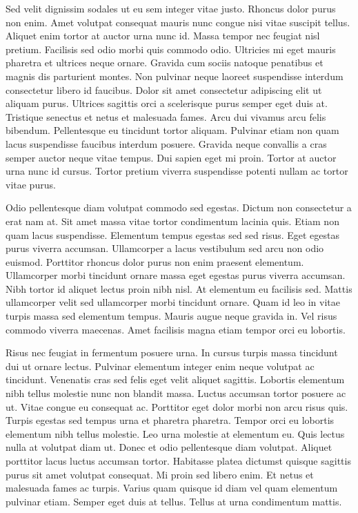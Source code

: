 \documentclass[11pt,a4paper]{article}
\begin{document}
Sed velit dignissim sodales ut eu sem integer vitae justo. Rhoncus dolor purus non enim. Amet volutpat consequat mauris nunc congue nisi vitae suscipit tellus. Aliquet enim tortor at auctor urna nunc id. Massa tempor nec feugiat nisl pretium. Facilisis sed odio morbi quis commodo odio. Ultricies mi eget mauris pharetra et ultrices neque ornare. Gravida cum sociis natoque penatibus et magnis dis parturient montes. Non pulvinar neque laoreet suspendisse interdum consectetur libero id faucibus. Dolor sit amet consectetur adipiscing elit ut aliquam purus. Ultrices sagittis orci a scelerisque purus semper eget duis at. Tristique senectus et netus et malesuada fames. Arcu dui vivamus arcu felis bibendum. Pellentesque eu tincidunt tortor aliquam. Pulvinar etiam non quam lacus suspendisse faucibus interdum posuere. Gravida neque convallis a cras semper auctor neque vitae tempus. Dui sapien eget mi proin. Tortor at auctor urna nunc id cursus. Tortor pretium viverra suspendisse potenti nullam ac tortor vitae purus.

Odio pellentesque diam volutpat commodo sed egestas. Dictum non consectetur a erat nam at. Sit amet massa vitae tortor condimentum lacinia quis. Etiam non quam lacus suspendisse. Elementum tempus egestas sed sed risus. Eget egestas purus viverra accumsan. Ullamcorper a lacus vestibulum sed arcu non odio euismod. Porttitor rhoncus dolor purus non enim praesent elementum. Ullamcorper morbi tincidunt ornare massa eget egestas purus viverra accumsan. Nibh tortor id aliquet lectus proin nibh nisl. At elementum eu facilisis sed. Mattis ullamcorper velit sed ullamcorper morbi tincidunt ornare. Quam id leo in vitae turpis massa sed elementum tempus. Mauris augue neque gravida in. Vel risus commodo viverra maecenas. Amet facilisis magna etiam tempor orci eu lobortis.

Risus nec feugiat in fermentum posuere urna. In cursus turpis massa tincidunt dui ut ornare lectus. Pulvinar elementum integer enim neque volutpat ac tincidunt. Venenatis cras sed felis eget velit aliquet sagittis. Lobortis elementum nibh tellus molestie nunc non blandit massa. Luctus accumsan tortor posuere ac ut. Vitae congue eu consequat ac. Porttitor eget dolor morbi non arcu risus quis. Turpis egestas sed tempus urna et pharetra pharetra. Tempor orci eu lobortis elementum nibh tellus molestie. Leo urna molestie at elementum eu. Quis lectus nulla at volutpat diam ut. Donec et odio pellentesque diam volutpat. Aliquet porttitor lacus luctus accumsan tortor. Habitasse platea dictumst quisque sagittis purus sit amet volutpat consequat. Mi proin sed libero enim. Et netus et malesuada fames ac turpis. Varius quam quisque id diam vel quam elementum pulvinar etiam. Semper eget duis at tellus. Tellus at urna condimentum mattis.
\end{document}
